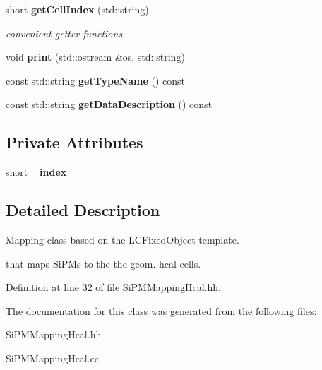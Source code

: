 \begin{DoxyCompactItemize}
\item 
short {\bf get\-Cell\-Index} (std\-::string)\label{classCALICE_1_1SiPMMappingHcal_a6c9e24b4de7ca1d73f6e408a7545acaf}

\begin{DoxyCompactList}\small\item\em convenient getter functions \end{DoxyCompactList}\item 
void {\bfseries print} (std\-::ostream \&os, std\-::string)\label{classCALICE_1_1SiPMMappingHcal_a98286b2ec859508c802a321e8e534ab6}

\item 
const std\-::string {\bfseries get\-Type\-Name} () const \label{classCALICE_1_1SiPMMappingHcal_a346183364fe44c07c4f5de7d8cd552b1}

\item 
const std\-::string {\bfseries get\-Data\-Description} () const \label{classCALICE_1_1SiPMMappingHcal_a6d35194870c3e2a16336e3582e80532f}

\end{DoxyCompactItemize}
\subsection*{Private Attributes}
\begin{DoxyCompactItemize}
\item 
short {\bfseries \-\_\-index}\label{classCALICE_1_1SiPMMappingHcal_a9ce9e5e9ffed61ae7ac85f230afaaf6c}

\end{DoxyCompactItemize}


\subsection{Detailed Description}
Mapping class based on the L\-C\-Fixed\-Object template. 

that maps Si\-P\-Ms to the the geom. hcal cells. 

Definition at line 32 of file Si\-P\-M\-Mapping\-Hcal.\-hh.



The documentation for this class was generated from the following files\-:\begin{DoxyCompactItemize}
\item 
Si\-P\-M\-Mapping\-Hcal.\-hh\item 
Si\-P\-M\-Mapping\-Hcal.\-cc\end{DoxyCompactItemize}
